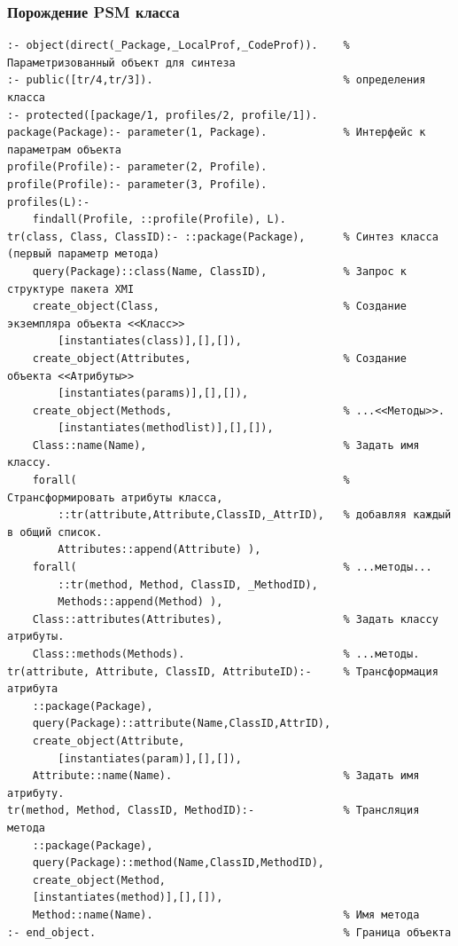 \documentclass[10pt]{beamer}
\begin{document}
\begin{frame}[fragile]
  \frametitle{Порождение PSM класса}

\begin{verbatim}
:- object(direct(_Package,_LocalProf,_CodeProf)).    % Параметризованный объект для синтеза
:- public([tr/4,tr/3]).                              % определения класса
:- protected([package/1, profiles/2, profile/1]).
package(Package):- parameter(1, Package).            % Интерфейс к параметрам объекта
profile(Profile):- parameter(2, Profile).
profile(Profile):- parameter(3, Profile).
profiles(L):-
    findall(Profile, ::profile(Profile), L).
tr(class, Class, ClassID):- ::package(Package),      % Синтез класса (первый параметр метода)
    query(Package)::class(Name, ClassID),            % Запрос к структуре пакета XMI
    create_object(Class,                             % Создание экземпляра объекта <<Класс>>
        [instantiates(class)],[],[]),
    create_object(Attributes,                        % Создание объекта <<Атрибуты>>
        [instantiates(params)],[],[]),
    create_object(Methods,                           % ...<<Методы>>.
        [instantiates(methodlist)],[],[]),
    Class::name(Name),                               % Задать имя классу.
    forall(                                          % Странсформировать атрибуты класса,
        ::tr(attribute,Attribute,ClassID,_AttrID),   % добавляя каждый в общий список.
        Attributes::append(Attribute) ),
    forall(                                          % ...методы...
        ::tr(method, Method, ClassID, _MethodID),
        Methods::append(Method) ),
    Class::attributes(Attributes),                   % Задать классу атрибуты.
    Class::methods(Methods).                         % ...методы.
tr(attribute, Attribute, ClassID, AttributeID):-     % Трансформация атрибута
    ::package(Package),
    query(Package)::attribute(Name,ClassID,AttrID),
    create_object(Attribute,
        [instantiates(param)],[],[]),
    Attribute::name(Name).                           % Задать имя атрибуту.
tr(method, Method, ClassID, MethodID):-              % Трансляция метода
    ::package(Package),
    query(Package)::method(Name,ClassID,MethodID),
    create_object(Method,
    [instantiates(method)],[],[]),
    Method::name(Name).                              % Имя метода
:- end_object.                                       % Граница объекта
\end{verbatim}
\end{frame}
\end{document}

